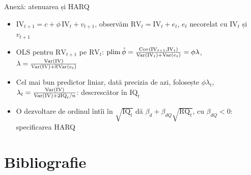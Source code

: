 \begin{frame}{Anexă: atenuarea și HARQ}
\hypertarget{atsapp3}{}
\itemsize{\small}
\begin{itemize}
    \item $\mathrm{IV}_{t+1} = c + \phi\,\mathrm{IV}_t + v_{t+1}$, observăm $\mathrm{RV}_t = \mathrm{IV}_t + e_t$, $e_t$ necorelat cu $\mathrm{IV}_t$ și $v_{t+1}$
    \item OLS pentru $\mathrm{RV}_{t+1}$ pe $\mathrm{RV}_t$: $\mathrm{plim}\,\hat\phi = \frac{\text{Cov}(\mathrm{IV}_{t+1}, \mathrm{IV}_t)}{\text{Var}(\mathrm{IV}_t) + \text{Var}(e_t)} = \phi\lambda$, $\lambda = \frac{\text{Var}(\mathrm{IV})}{\text{Var}(\mathrm{IV}) + \mathbb{E}\text{Var}(e_t)}$
    \item Cel mai bun predictor liniar, dată precizia de azi, folosește $\phi\lambda_t$, $\lambda_t = \frac{\text{Var}(\mathrm{IV})}{\text{Var}(\mathrm{IV}) + 2\mathrm{IQ}_t/n}$: descrescător în $\mathrm{IQ}_t$
    \item O dezvoltare de ordinul întîi în $\sqrt{\mathrm{IQ}_t}$ dă $\beta_d + \beta_{dQ}\sqrt{\mathrm{RQ}_t}$, cu $\beta_{dQ} < 0$: specificarea HARQ 
\end{itemize}
\end{frame}


\section{Bibliografie}

